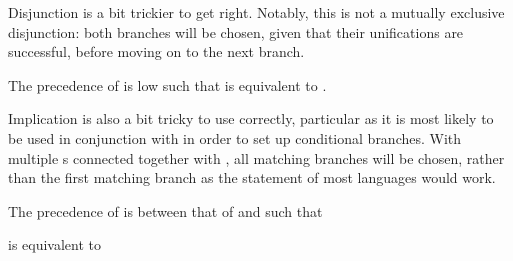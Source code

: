 Disjunction is a bit trickier to get right. Notably, this is not a mutually
exclusive disjunction: both branches will be chosen, given that their unifications
are successful, before moving on to the next branch.

The precedence of  is low such that 
is equivalent to .

\begin{prooftree}
\end{prooftree}

\begin{prooftree}
\end{prooftree}

Implication is also a bit tricky to use correctly, particular as it is most likely
to be used in conjunction with  in order to set up conditional branches.
With multiple s connected together with , all matching branches
will be chosen, rather than the first matching branch as the  statement
of most languages would work.

The precedence of  is between that of  and  such that

\begin{center}
\end{center}

is equivalent to

\begin{center}
\end{center}
